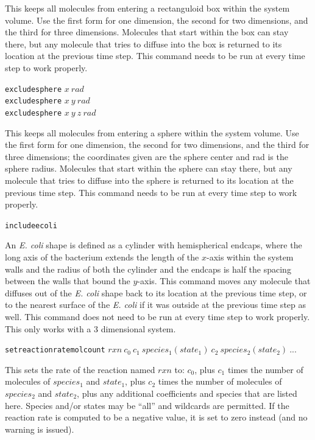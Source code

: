 \documentclass {book}
\newcommand {\ttt} {\texttt}
\begin{document}
\begin{description}
This keeps all molecules from entering a rectanguloid box within the system volume. Use the first form for one dimension, the second for two dimensions, and the third for three dimensions. Molecules that start within the box can stay there, but any molecule that tries to diffuse into the box is returned to its location at the previous time step. This command needs to be run at every time step to work properly.

\item{\ttt{excludesphere} $x\ rad$\\
\ttt{excludesphere} $x\ y\ rad$\\
\ttt{excludesphere} $x\ y\ z\ rad$}

This keeps all molecules from entering a sphere within the system volume. Use the first form for one dimension, the second for two dimensions, and the third for three dimensions; the coordinates given are the sphere center and rad is the sphere radius. Molecules that start within the sphere can stay there, but any molecule that tries to diffuse into the sphere is returned to its location at the previous time step. This command needs to be run at every time step to work properly.

\item{\ttt{includeecoli}}

An \textit{E. coli} shape is defined as a cylinder with hemispherical endcaps, where the long axis of the bacterium extends the length of the $x$-axis within the system walls and the radius of both the cylinder and the endcaps is half the spacing between the walls that bound the $y$-axis. This command moves any molecule that diffuses out of the \textit{E. coli} shape back to its location at the previous time step, or to the nearest surface of the \textit{E. coli} if it was outside at the previous time step as well. This command does not need to be run at every time step to work properly. This only works with a 3 dimensional system.

\item{\ttt{setreactionratemolcount} $rxn\ c_0\ c_1\ species_1(state_1)\ c_2\ species_2(state_2)\ ...$}

This sets the rate of the reaction named $rxn$ to: $c_0$, plus $c_1$ times the number of molecules of $species_1$ and $state_1$, plus $c_2$ times the number of molecules of $species_2$ and $state_2$, plus any additional coefficients and species that are listed here. Species and/or states may be ``all'' and wildcards are permitted. If the reaction rate is computed to be a negative value, it is set to zero instead (and no warning is issued).


\end{description}
\end{document}
